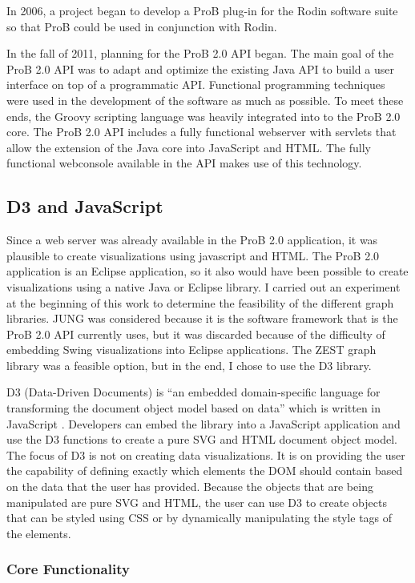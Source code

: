 In 2006, a project began to develop a ProB plug-in for the Rodin software suite so that ProB could be used in conjunction with Rodin. 

In the fall of 2011, planning for the ProB 2.0 API began.  The main goal of the ProB 2.0 API was to adapt and optimize the existing Java API to build a user interface on top of a programmatic API. Functional programming techniques were used in the development of the software as much as possible. To meet these ends, the Groovy scripting language was heavily integrated into to the ProB 2.0 core. The ProB 2.0 API includes a fully functional webserver with servlets that allow the extension of the Java core into JavaScript and HTML. The fully functional webconsole available in the API makes use of this technology.

\subsection{D3 and JavaScript}

Since a web server was already available in the ProB 2.0 application, it was plausible to create visualizations using javascript and HTML. The ProB 2.0 application is an Eclipse application, so it also would have been possible to create visualizations using a native Java or Eclipse library. I carried out an experiment at the beginning of this work to determine the feasibility of the different graph libraries. JUNG was considered because it is the software framework that is the ProB 2.0 API currently uses, but it was discarded because of the difficulty of embedding Swing visualizations into Eclipse applications. The ZEST graph library was a feasible option, but in the end, I chose to use the D3 library. 

D3 (Data-Driven Documents) is ``an embedded domain-specific language for transforming
the document object model based on data'' which is written in JavaScript \cite{2011-d3}. Developers can embed the library into a JavaScript application and use the D3 functions to create a pure SVG and HTML document object model. The focus of D3 is not on creating data visualizations. It is on providing the user the capability of defining exactly which elements the DOM should contain based on the data that the user has provided. Because the objects that are being manipulated are pure SVG and HTML, the user can use D3 to create objects that can be styled using CSS or by dynamically manipulating the style tags of the elements.

\subsubsection{Core Functionality}

